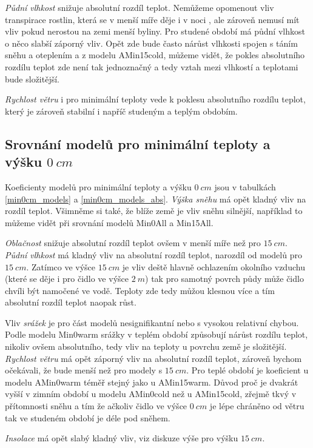 \textit{Půdní vlhkost} snižuje absolutní rozdíl teplot. Nemůžeme opomenout vliv transpirace rostlin, která se v menší míře děje i v noci \parencite{nighttranspiration}, ale zároveň nemusí mít vliv pokud nerostou na zemi menší byliny. Pro studené období má půdní vlhkost o něco slabší záporný vliv. Opět zde bude často nárůst vlhkosti spojen s táním sněhu a oteplením a z modelu AMin15cold, můžeme vidět, že pokles absolutního rozdílu teplot zde není tak jednoznačný a tedy vztah mezi vlhkostí a teplotami bude složitější.

\textit{Rychlost větru} i pro minimální teploty vede k poklesu absolutního rozdílu teplot, který je zároveň stabilní i napříč studeným a teplým obdobím.

\subsection{Srovnání modelů pro minimální teploty a výšku $\SI{0}{cm}$}
Koeficienty modelů pro minimální teploty a výšku $\SI{0}{cm}$ jsou v tabulkách \ref{min0cm_models} a \ref{min0cm_models_abs}. \textit{Výška sněhu} má opět kladný vliv na rozdíl teplot. Všimněme si také, že blíže země je vliv sněhu silnější, například to můžeme vidět při srovnání modelů Min0All a Min15All.

\textit{Oblačnost} snižuje absolutní rozdíl teplot ovšem v menší míře než pro $\SI{15}{cm}$. \textit{Půdní vlhkost} má kladný vliv na absolutní rozdíl teplot, narozdíl od modelů pro $\SI{15}{cm}$. Zatímco ve výšce $\SI{15}{cm}$ je vliv deště hlavně ochlazením okolního vzduchu (které se děje i pro čidlo ve výšce $\SI{2}{m}$) tak pro samotný povrch půdy může čidlo chvíli být namočené ve vodě. Teploty zde tedy můžou klesnou více a tím absolutní rozdíl teplot naopak růst.

Vliv \textit{srážek} je pro část modelů nesignifikantní nebo s vysokou relativní chybou. Podle modelu Min0warm srážky v teplém období způsobují nárůst rozdílu teplot, nikoliv ovšem absolutního, tedy vliv na teploty u povrchu země je složitější. \textit{Rychlost větru} má opět záporný vliv na absolutní rozdíl teplot, zároveň bychom očekávali, že bude menší než pro modely s $\SI{15}{cm}$. Pro teplé období je koeficient u modelu AMin0warm téměř stejný jako u AMin15warm. Důvod proč je dvakrát vyšší v zimním období u modelu AMin0cold než u AMin15cold, zřejmě tkvý v přítomnosti sněhu a tím že ačkoliv čidlo ve výšce $\SI{0}{cm}$ je lépe chráněno od větru tak ve studeném období je déle pod sněhem. 

\textit{Insolace} má opět slabý kladný vliv, viz diskuze výše pro výšku $\SI{15}{cm}$.

